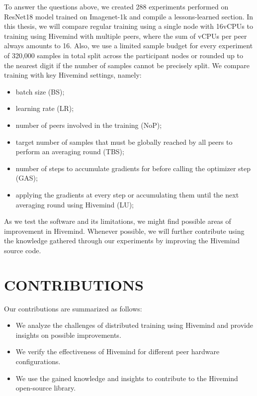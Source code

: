 To answer the questions above, we created 288 experiments performed on ResNet18 \cite{he2015deep} model trained on Imagenet-1k \cite{deng2009imagenet} and compile a lessons-learned section.
In this thesis, we will compare regular training using a single node with 16vCPUs to training using Hivemind with multiple peers, where the sum of vCPUs per peer always amounts to 16.
Also, we use a limited sample budget for every experiment of 320,000 samples in total split across the participant nodes or rounded up to the nearest digit if the number of samples cannot be precisely split.
We compare training with key Hivemind settings, namely:
\begin{itemize}
    \item batch size (BS);
    \item learning rate (LR);
    \item number of peers involved in the training (NoP);
    \item target number of samples that must be globally reached by all peers to perform an averaging round (TBS);
    \item number of steps to accumulate gradients for before calling the optimizer step (GAS);
    \item applying the gradients at every step or accumulating them until the next averaging round using Hivemind (LU);
\end{itemize}

As we test the software and its limitations, we might find possible areas of improvement in Hivemind.
Whenever possible, we will further contribute using the knowledge gathered through our experiments by improving the Hivemind \cite{hivemind} source code.

\section{CONTRIBUTIONS}

Our contributions are summarized as follows:
\begin{itemize}
    \item We analyze the challenges of distributed training using Hivemind and provide insights on possible improvements.
    \item We verify the effectiveness of Hivemind for different peer hardware configurations.
    \item We use the gained knowledge and insights to contribute to the Hivemind open-source library.
\end{itemize}
